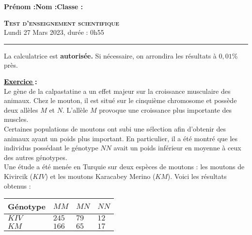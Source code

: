 \documentclass[11pt]{article}
\begin{document}
\setcounter{numexos}{0}%
\newcommand{\exercice}[1]{%
	\addtocounter{numexos}{1}%
	\textcolor{black}{\underline{\textbf{Exercice}\,\textbf{\thenumexos}}\,\textbf{:}}\,#1%
}


\noindent\textbf{Prénom :}\hfill\textbf{Nom :}\hfill\textbf{Classe :}\\[1cm]
\begin{center}
\textbf{\LARGE \textsc{Test d'enseignement scientifique}}\\[2mm]

{\large Lundi 27 Mars 2023, durée : 0h55}\\[1mm]
\noindent\rule{12cm}{0.4pt}
\end{center}
La calculatrice est \textbf{autorisée.} Si nécessaire, on arrondira les
résultats à $0,01$\% près.\\[1cm]

\exercice \\

Le gène de la calpastatine a un effet majeur sur la croissance musculaire des animaux. Chez le mouton, il est situé sur le cinquième chromosome et possède deux allèles $M$ et $N$. L’allèle $M$ provoque une croissance plus importante des muscles.\\
Certaines populations de moutons ont subi une sélection afin d’obtenir des animaux ayant un poids plus important. En particulier, il a été montré que les individus possédant le génotype $NN$ avait un poids inférieur en moyenne à ceux des autres génotypes.\\
Une étude a été menée en Turquie sur deux espèces de moutons : les moutons de Kivircik
($KIV$) et les moutons Karacabey Merino ($KM$). Voici les résultats obtenus :
\begin{center}
	\begin{tabular}{|>{\centering\arraybackslash}m{3cm}|>{\centering\arraybackslash}m{3cm}|>{\centering\arraybackslash}m{3cm}|>{\centering\arraybackslash}m{3cm}|}
		\hline
		\rule[-1ex]{0pt}{2.5ex}  \textbf{Génotype} & $MM$ & $MN$ & $NN$  \\
		\hline
		\rule[-1ex]{0pt}{2.5ex}  $KIV$ & $245$ & $79$ & $12$  \\
		\hline
		\rule[-1ex]{0pt}{2.5ex} $KM$ & $166$ & $65$ & $17$  \\
		\hline
	\end{tabular}
\end{center}
\end{document}
